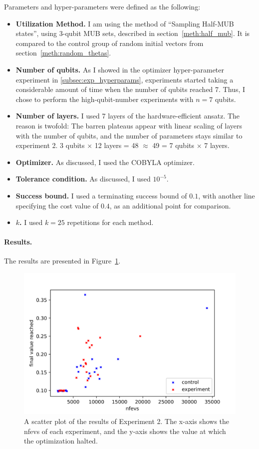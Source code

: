 \documentclass[a4paper,12pt]{article}
\newcommand{\e}[1]{ 10^{#1}}
\newenvironment{denseitemize}%
  {\begin{itemize}%
    \setlength{\itemsep}{0pt}}%
  {\end{itemize}}
\begin{document}
Parameters and hyper-parameters were defined as the following:
\begin{denseitemize}
    \item \textbf{Utilization Method.} I am using the method of ``Sampling Half-MUB states'', using 3-qubit MUB sets, described in section~\ref{meth:half_mub}. It is compared to the control group of random initial vectors from section~\ref{meth:random_thetas}.
    \item \textbf{Number of qubits.} As I showed in the optimizer hyper-parameter experiment in \ref{subsec:exp_hyperparams}, experiments started taking a considerable amount of time when the number of qubits reached 7.
    Thus, I chose to perform the high-qubit-number experiments with $n=7$ qubits.
    \item \textbf{Number of layers.} I used 7 layers of the hardware-efficient ansatz. The reason is twofold: The barren plateaus appear with linear scaling of layers with the number of qubits, and the number of parameters stays similar to experiment 2.
    3 qubits $\times$ 12 layers = 48 $\approx$ 49 = 7 qubits $\times$ 7 layers.
    \item \textbf{Optimizer.} As discussed, I used the COBYLA optimizer.
    \item \textbf{Tolerance condition.} As discussed, I used $\e{-5}$.
    \item \textbf{Success bound.} I used a terminating success bound of $0.1$, with another line specifying the cost value of $0.4$, as an additional point for comparison.
    \item \textbf{$k$.} I used $k=25$ repetitions for each method.
\end{denseitemize}

\paragraph*{Results.}
The results are presented in Figure~\ref{fig:7qubits}.

\begin{figure}[]
    \centering
    \captionsetup{justification=centering, margin=1cm}
    \includegraphics[scale=0.8]{7qubits.png}
    \caption{A scatter plot of the results of Experiment 2. The x-axis shows the nfevs of each experiment, and the y-axis shows the value at which the optimization halted.}
    \label{fig:7qubits}
\end{figure}
\end{document}

